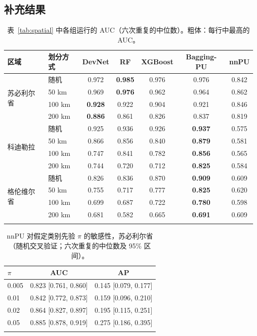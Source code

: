 \documentclass[pdflatex,sn-apa]{sn-jnl}
\begin{document}
\begin{appendices}

\section{补充结果}\label{app:full}

\begin{table}[!h]
\caption{表~\ref{tab:spatial} 中各组运行的 AUC（六次重复的中位数）。粗体：每行中最高的 AUC。}\label{tab:spatial-auc}
\footnotesize
\setlength{\tabcolsep}{3pt}
\begin{tabular*}{\textwidth}{@{\extracolsep\fill}llccccc}
\toprule
区域 & 划分方式 & DevNet & RF & XGBoost & Bagging-PU & nnPU \\
\midrule
\multirow{4}{*}{苏必利尔省} & 随机 & 0.972 & \textbf{0.985} & 0.976 & 0.976 & 0.842 \\
 & 50 km & 0.969 & \textbf{0.976} & 0.962 & 0.964 & 0.862 \\
 & 100 km & \textbf{0.928} & 0.922 & 0.904 & 0.921 & 0.846 \\
 & 200 km & \textbf{0.886} & 0.861 & 0.826 & 0.837 & 0.819 \\
\midrule
\multirow{4}{*}{科迪勒拉} & 随机 & 0.925 & 0.936 & 0.926 & \textbf{0.937} & 0.575 \\
 & 50 km & 0.866 & 0.856 & 0.840 & \textbf{0.879} & 0.581 \\
 & 100 km & 0.747 & 0.841 & 0.782 & \textbf{0.856} & 0.565 \\
 & 200 km & 0.744 & 0.720 & 0.712 & \textbf{0.825} & 0.584 \\
\midrule
\multirow{4}{*}{格伦维尔省} & 随机 & 0.826 & 0.836 & 0.870 & \textbf{0.909} & 0.609 \\
 & 50 km & 0.755 & 0.717 & 0.777 & \textbf{0.825} & 0.620 \\
 & 100 km & 0.699 & 0.687 & 0.722 & \textbf{0.780} & 0.598 \\
 & 200 km & 0.681 & 0.582 & 0.665 & \textbf{0.691} & 0.609 \\
\botrule
\end{tabular*}
\end{table}

\begin{table}[!h]
\caption{nnPU 对假定类别先验 $\pi$ 的敏感性，苏必利尔省（随机交叉验证；六次重复的中位数及 95\% 区间）。}\label{tab:prior}
\footnotesize
\begin{tabular*}{0.6\textwidth}{@{\extracolsep\fill}lcc}
\toprule
$\pi$ & AUC & AP \\
\midrule
0.005 & 0.823 [0.761, 0.860] & 0.145 [0.079, 0.177] \\
0.01 & 0.842 [0.772, 0.873] & 0.159 [0.096, 0.210] \\
0.02 & 0.864 [0.827, 0.897] & 0.195 [0.115, 0.251] \\
0.05 & 0.885 [0.878, 0.919] & 0.275 [0.186, 0.395] \\
\botrule
\end{tabular*}
\end{table}


\end{appendices}
\end{document}
